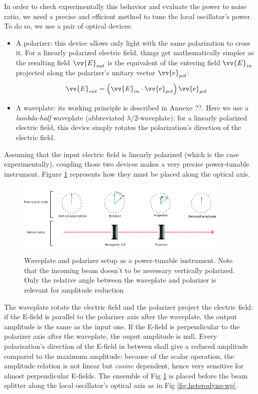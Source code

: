 \documentclass[10pt]{report}
\begin{document}
In order to check experimentally this behavior and evaluate the power to noise ratio, we need a precise and efficient method to tune the local oscillator's power. To do so, we use a pair of optical devices:
\begin{itemize}
	\item A polarizer: this device allows only light with the same polarization to cross it. For a linearly polarized electric field, things get mathematically simpler as the resulting field $\vv{E}_{out}$ is the equivalent of the entering field $\vv{E}_{in}$ projected along the polarizer's unitary vector $\vv{e}_{pol}$:
	\begin{equation}
	\vv{E}_{out} = \left( \vv{E}_{in} \cdot \vv{e}_{pol} \right) \vv{e}_{pol}
	\end{equation}
	\item A waveplate: its working principle is described in Annexe ??. Here we use a \textit{lambda-half} waveplate (abbreviated $\lambda/2$-waveplate): for a linearly polarized electric field, this device simply rotates the polarization's direction of the electric field.  
\end{itemize}

Assuming that the input electric field is linearly polarized (which is the case experimentally), coupling those two devices makes a very precise power-tunable instrument. Figure \ref{fig:wp-pol-setup} represents how they must be placed along the optical axis.

\begin{figure}[h!]
\caption{Waveplate and polarizer setup as a power-tunable instrument. Note that the incoming beam doesn't to be necessary vertically polarized. Only the relative angle between the waveplate and polarizer is relevant for amplitude reduction}
\centering
\includegraphics[width=0.9\textwidth]{wp-pol-setup}
\label{fig:wp-pol-setup}
\end{figure}

The waveplate rotate the electric field and the polarizer project the electric field: if the E-field is parallel to the polarizer axis after the waveplate, the output amplitude is the same as the input one. If the E-field is perpendicular to the polarizer axis after the waveplate, the ouput amplitude is null. Every polarisation's direction of the E-field in between shall give a reduced amplitude compared to the maximum amplitude: because of the scalar operation, the amplitude relation is not linear but \textit{cosine} dependent, hence very sensitive for almost perpendicular E-fields. The ensemble of Fig \ref{fig:wp-pol-setup} is placed before the beam splitter along the local oscillator's optical axis as in Fig \ref{fig:heterodyne-wp}.
\end{document}
